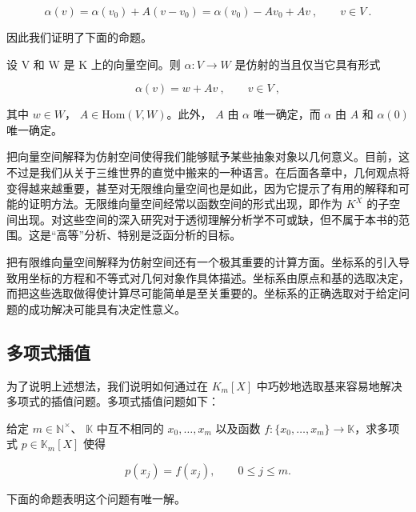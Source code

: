 \begin{equation}
\alpha(v)=\alpha(v_{0})+A(v-v_{0})=\alpha(v_{0})-A v_{0}+A v~,\qquad v\in V~.
\end{equation}

因此我们证明了下面的命题。

\begin{proposition}

设 V 和 W 是 K 上的向量空间。则  $ \alpha: V \to W $ 是仿射的当且仅当它具有形式

\begin{equation}
\alpha(v)=w+A v~,\qquad v\in V~,
\end{equation}

其中  $ w \in W $， $ A \in \text{Hom}(V, W) $。此外， $ A $ 由  $ \alpha $ 唯一确定，而  $ \alpha $ 由  $ A $ 和  $ \alpha(0) $ 唯一确定。

把向量空间解释为仿射空间使得我们能够赋予某些抽象对象以几何意义。目前，这不过是我们从关于三维世界的直觉中搬来的一种语言。在后面各章中，几何观点将变得越来越重要，甚至对无限维向量空间也是如此，因为它提示了有用的解释和可能的证明方法。无限维向量空间经常以函数空间的形式出现，即作为  $ K^X $ 的子空间出现。对这些空间的深入研究对于透彻理解分析学不可或缺，但不属于本书的范围。这是“高等”分析、特别是泛函分析的目标。

把有限维向量空间解释为仿射空间还有一个极其重要的计算方面。坐标系的引入导致用坐标的方程和不等式对几何对象作具体描述。坐标系由原点和基的选取决定，而把这些选取做得使计算尽可能简单是至关重要的。坐标系的正确选取对于给定问题的成功解决可能具有决定性意义。

\end{proposition}

\subsection*{多项式插值}

为了说明上述想法，我们说明如何通过在  $ K_m[X] $ 中巧妙地选取基来容易地解决多项式的插值问题。多项式插值问题如下：

给定  $ m \in \mathbb{N}^\times $、 $ \mathbb{K} $ 中互不相同的  $ x_0, \ldots, x_m $ 以及函数  $ f: \{x_0, \ldots, x_m\} \to \mathbb{K} $，求多项式  $ p \in \mathbb{K}_m[X] $ 使得

\begin{equation}
p(x_{j})=f(x_{j}),\qquad0\leq j\leq m.
\end{equation}

下面的命题表明这个问题有唯一解。

